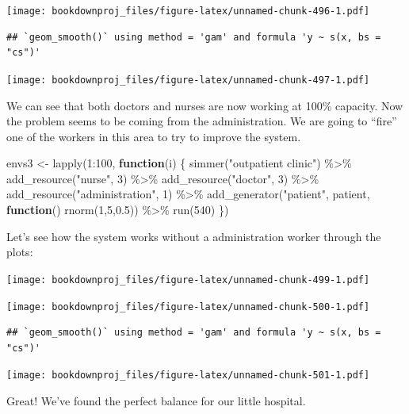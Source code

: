 \documentclass[
]{book}
\newenvironment{Shaded}{\begin{snugshade}}{\end{snugshade}}
\newcommand{\ControlFlowTok}[1]{\textcolor[rgb]{0.13,0.29,0.53}{\textbf{#1}}}
\newcommand{\DecValTok}[1]{\textcolor[rgb]{0.00,0.00,0.81}{#1}}
\newcommand{\FloatTok}[1]{\textcolor[rgb]{0.00,0.00,0.81}{#1}}
\newcommand{\FunctionTok}[1]{\textcolor[rgb]{0.00,0.00,0.00}{#1}}
\newcommand{\NormalTok}[1]{#1}
\newcommand{\OtherTok}[1]{\textcolor[rgb]{0.56,0.35,0.01}{#1}}
\newcommand{\SpecialCharTok}[1]{\textcolor[rgb]{0.00,0.00,0.00}{#1}}
\newcommand{\StringTok}[1]{\textcolor[rgb]{0.31,0.60,0.02}{#1}}
\theoremstyle{definition}
\theoremstyle{definition}
\theoremstyle{definition}
\theoremstyle{definition}
\theoremstyle{remark}
\begin{document}
\texttt{[image: bookdownproj\_files/figure-latex/unnamed-chunk-496-1.pdf]}

\begin{verbatim}
## `geom_smooth()` using method = 'gam' and formula 'y ~ s(x, bs = "cs")'
\end{verbatim}

\texttt{[image: bookdownproj\_files/figure-latex/unnamed-chunk-497-1.pdf]}

We can see that both doctors and nurses are now working at 100\% capacity. Now the problem seems to be coming from the administration. We are going to ``fire'' one of the workers in this area to try to improve the system.

\begin{Shaded}
\begin{Highlighting}[]
\NormalTok{envs3 }\OtherTok{\textless{}{-}} \FunctionTok{lapply}\NormalTok{(}\DecValTok{1}\SpecialCharTok{:}\DecValTok{100}\NormalTok{, }\ControlFlowTok{function}\NormalTok{(i) \{}
  \FunctionTok{simmer}\NormalTok{(}\StringTok{"outpatient clinic"}\NormalTok{) }\SpecialCharTok{\%\textgreater{}\%}
    \FunctionTok{add\_resource}\NormalTok{(}\StringTok{"nurse"}\NormalTok{, }\DecValTok{3}\NormalTok{) }\SpecialCharTok{\%\textgreater{}\%}
    \FunctionTok{add\_resource}\NormalTok{(}\StringTok{"doctor"}\NormalTok{, }\DecValTok{3}\NormalTok{) }\SpecialCharTok{\%\textgreater{}\%}
    \FunctionTok{add\_resource}\NormalTok{(}\StringTok{"administration"}\NormalTok{, }\DecValTok{1}\NormalTok{) }\SpecialCharTok{\%\textgreater{}\%}
    \FunctionTok{add\_generator}\NormalTok{(}\StringTok{"patient"}\NormalTok{, patient, }\ControlFlowTok{function}\NormalTok{() }\FunctionTok{rnorm}\NormalTok{(}\DecValTok{1}\NormalTok{,}\DecValTok{5}\NormalTok{,}\FloatTok{0.5}\NormalTok{)) }\SpecialCharTok{\%\textgreater{}\%}
    \FunctionTok{run}\NormalTok{(}\DecValTok{540}\NormalTok{)}
\NormalTok{\})}
\end{Highlighting}
\end{Shaded}

Let's see how the system works without a administration worker through the plots:

\texttt{[image: bookdownproj\_files/figure-latex/unnamed-chunk-499-1.pdf]}

\texttt{[image: bookdownproj\_files/figure-latex/unnamed-chunk-500-1.pdf]}

\begin{verbatim}
## `geom_smooth()` using method = 'gam' and formula 'y ~ s(x, bs = "cs")'
\end{verbatim}

\texttt{[image: bookdownproj\_files/figure-latex/unnamed-chunk-501-1.pdf]}

Great! We've found the perfect balance for our little hospital.

  
\end{document}
